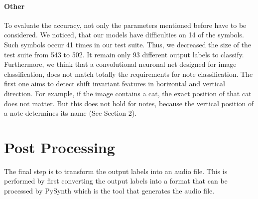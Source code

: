 \documentclass[twocolumn]{article}
\begin{document}
\paragraph{Other}
To evaluate the accuracy, not only the parameters mentioned before have to be considered. We noticed, that our models have difficulties on 14 of the symbols. Such symbols occur 41 times in our test suite. Thus, we decreased the size of the test suite from 543 to 502. It remain only 93 different output labels to classify. \\
Furthermore, we think that a convolutional neuronal net designed for image classification, does not match totally the requirements for note classification. The first one aims to detect shift invariant features in horizontal and vertical direction. For example, if the image contains a cat, the exact position of that cat does not matter. But this does not hold for notes, because the vertical position of a note determines its name (See Section 2).  


\section{Post Processing}
The final step is to transform the output labels into an audio file. This is performed by first converting the output labels into a format that can be processed by PySynth \cite{pysynth} which is the tool that generates the audio file.


  
\end{document}
